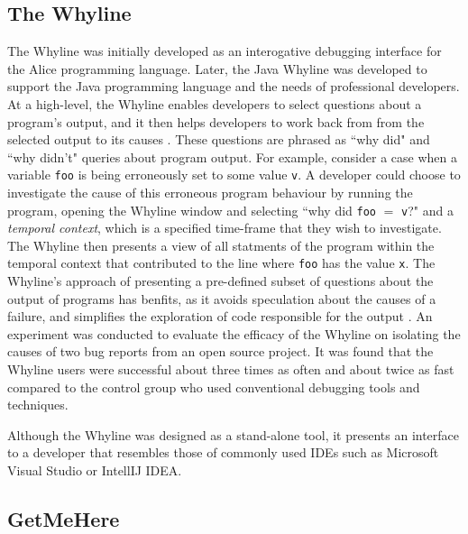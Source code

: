 \subsection{The Whyline}
\label{subsec:TheWhyline}

\par The Whyline was initially developed as an interogative debugging interface
for the Alice programming language. Later, the Java Whyline was developed to 
support the Java programming language and the needs of professional developers.
At a high-level, the Whyline enables developers to select questions about a
program's output, and it then helps developers to work back from from the 
selected output to its causes \cite{ko-2009-java-whyline}.
These questions are phrased as ``why did" and ``why didn't"
queries about program output.
For example, consider a case when a variable \texttt{foo} is being erroneously 
set to some value \texttt{v}.
A developer could choose to investigate the cause of this erroneous program
behaviour by running the program, opening the Whyline window and selecting
``why did \texttt{foo} $=$ \texttt{v}?" and a \emph{temporal context}, which is
a specified time-frame that they wish to investigate.
The Whyline then presents a view of all statments of the program within the
temporal context that contributed to the line where \texttt{foo} has the value
\texttt{x}. 
The Whyline's approach of presenting a pre-defined subset of questions about the 
output of programs has benfits, as it avoids speculation about the causes of
a failure, and simplifies the exploration of code responsible for the output
\cite{ko-2009-java-whyline}.
An experiment was conducted to evaluate the efficacy of the Whyline on 
isolating the causes of two bug reports from an open source project.
It was found that the Whyline users were successful about three times as often
and about twice as fast compared to the control group who used conventional
debugging tools and techniques.

\par Although the Whyline was designed as a stand-alone tool, it presents an 
interface to a developer that resembles those of commonly used \acp{IDE} such
as Microsoft Visual Studio or IntellIJ IDEA.

\subsection{GetMeHere}
\label{subsec:GetMeHere}

